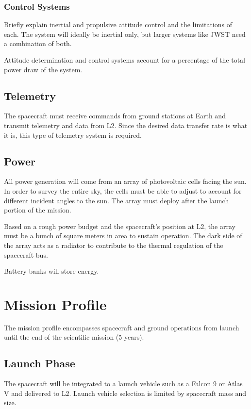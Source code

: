 \documentclass{ws-jai}
\begin{document}
\subsubsection{Control Systems}
\label{ssS:control}
Briefly explain inertial and propulsive attitude control and the limitations of each. The system will ideally be inertial only, but larger systems like JWST need a combination of both.

Attitude determination and control systems account for a percentage of the total power draw of the system.

\subsection{Telemetry}
\label{sS:telemetry}
The spacecraft must receive commands from ground stations at Earth and transmit telemetry and data from L2. Since the desired data transfer rate is what it is, this type of telemetry system is required.

\subsection{Power}
\label{sS:power}
All power generation will come from an array of photovoltaic cells facing the sun. In order to survey the entire sky, the cells must be able to adjust to account for different incident angles to the sun. The array must deploy after the launch portion of the mission.

Based on a rough power budget and the spacecraft's position at L2, the array must be a bunch of square meters in area to sustain operation. The dark side of the array acts as a radiator to contribute to the thermal regulation of the spacecraft bus.

Battery banks will store energy.

\section{Mission Profile}
\label{S:mission}
The mission profile encompasses spacecraft and ground operations from launch until the end of the scientific mission (5 years).

\subsection{Launch Phase}
\label{sS:launch}
The spacecraft will be integrated to a launch vehicle such as a Falcon 9 or Atlas V and delivered to L2. Launch vehicle selection is limited by spacecraft mass and size.
\end{document}
